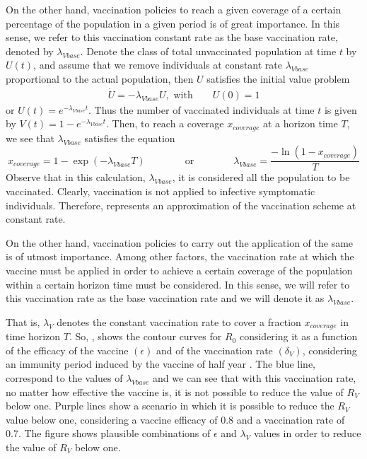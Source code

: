 On the other hand, vaccination policies to reach a given coverage
of a certain percentage of the population in a given period is of
great importance.
In this sense, we refer to this vaccination constant rate as the
base vaccination rate, denoted by $ \lambda_{Vbase}$.
Denote the class of total unvaccinated population at time $t$ by
$U(t)$, and assume that we remove individuals at constant rate
$\lambda_{Vbase}$ proportional to the actual population, then $U$
satisfies the initial value problem
\begin{align*}
    \dot{U} =-\lambda_{Vbase} U,
        \text{ with}
        \qquad
        U(0)=1
\end{align*}
or $U(t)=e^{-\lambda_{Vbase}t}$. Thus the number of
vaccinated individuals at time $t$ is given by
$V(t)=1-e^{-\lambda_{Vbase}t}$.
Then, to reach a coverage $x_{coverage}$ at a horizon time $T$, we
see that
$\lambda_{Vbase}$ satisfies the equation
\begin{equation}
    \label{eqn:lambda_base}
    x_{coverage} = 1 - \exp(-\lambda_{Vbase} T) \qquad\qquad
    \textrm{or}
    \qquad\qquad \lambda_{Vbase} = \frac{-\ln{(1-x_{coverage})}}{T}
\end{equation}
    Observe that in this calculation, $\lambda_{Vbase}$, it is
considered all the population to be vaccinated. Clearly,
vaccination is not applied to infective
symptomatic individuals. Therefore, 
represents an approximation of the vaccination scheme at constant
rate.

    On the other hand, vaccination policies to carry out the
application of the same is of utmost importance. Among other
factors, the vaccination rate at which the vaccine must be applied
in order to achieve a certain coverage of the population within a
certain horizon time must be considered. In this sense, we
will refer to this vaccination rate as the base vaccination rate
and we will denote it as $ \lambda_{Vbase}$.

    That is, $\lambda_V$ denotes the constant vaccination rate to
cover  a fraction $x_{coverage}$ in time horizon $T$. So,
, shows the contour curves for $ R_0 $ considering
it as a function of the efficacy of the vaccine $ (\epsilon) $ and
of the vaccination rate $ (\delta_V) $, considering an
immunity period induced by the vaccine of half year . The blue
line, correspond to the values of $\lambda_{Vbase}$ and we can see
that with this vaccination rate, no matter how effective the
vaccine is, it is not possible to reduce the value of $R_V$ below
one. Purple lines show a scenario in which it is possible
to reduce the $R_V$ value below one, considering a vaccine efficacy
of \num{0.8} and a vaccination rate of \num{0.7}. The figure shows plausible
combinations of $\epsilon$ and $\lambda_V$ values in order to reduce the value
of $R_V$ below one.


